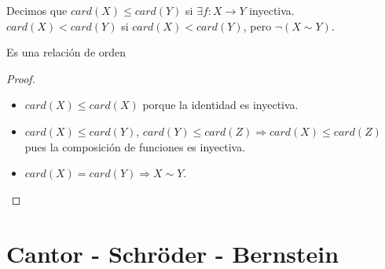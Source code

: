 \begin{definition}
    Decimos que $card(X) \leq card(Y)$ si $\exists f: X \to Y$ inyectiva. \\
    $card(X) < card(Y)$ si $card(X) < card(Y)$, pero $\neg(X\sim Y)$.
\end{definition}

\begin{prop}
    Es una relación de orden
    \begin{proof}
        \begin{itemize}
            \item $card(X) \leq card(X)$ porque la identidad es inyectiva.
            \item $card(X) \leq card(Y)$, $card(Y) \leq card(Z) \Rightarrow card(X) \leq card(Z)$ pues la composición de funciones es inyectiva.
            \item $card(X) = card(Y) \Rightarrow X \sim Y$.
        \end{itemize}
    \end{proof}
\end{prop}

\section{Cantor - Schröder - Bernstein}


